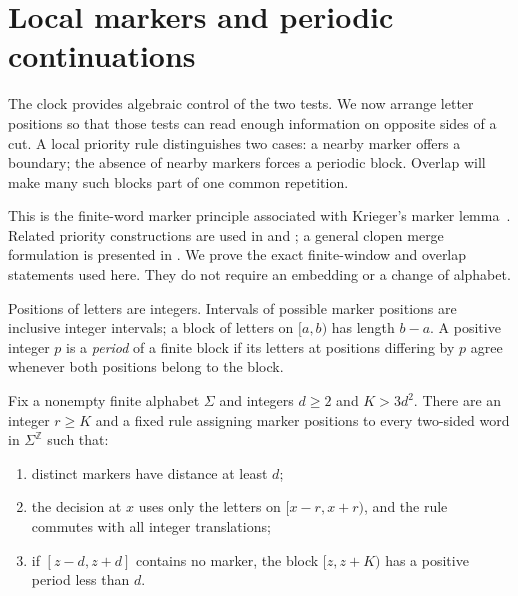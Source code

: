 \section{Local markers and periodic continuations}\label{marker:section}

The clock provides algebraic control of the two tests. We now arrange
letter positions so that those tests can read enough information on
opposite sides of a cut. A local priority rule distinguishes two cases:
a nearby marker offers a boundary; the absence of nearby markers forces
a periodic block. Overlap will make many such blocks part of one common
repetition.

This is the finite-word marker principle associated with Krieger's
marker lemma~\cite[Lemma~2]{Krieger1982}. Related priority constructions
are used in \cite[Section~4]{HeightThirteen} and
\cite[Section~4.1]{HeightFour}; a general clopen merge formulation is
presented in \cite[Lemmas~3.2--3.4]{Meyerovitch2025}. We prove the exact
finite-window and overlap statements used here. They do not require an
embedding or a change of alphabet.

Positions of letters are integers. Intervals of possible marker
positions are inclusive integer intervals; a block of letters on
$[a,b)$ has length $b-a$. A positive integer $p$ is a \emph{period}
of a finite block if its letters at positions differing by $p$ agree
whenever both positions belong to the block.

\begin{lemma}\label{marker:local}
Fix a nonempty finite alphabet $\Sigma$ and integers $d\ge2$ and
$K>3d^2$. There are an integer $r\ge K$ and a fixed rule assigning
marker positions to every two-sided word in $\Sigma^{\mathbb Z}$
such that:
\begin{enumerate}[label=\textup{(\roman*)}]
\item distinct markers have distance at least $d$;
\item the decision at $x$ uses only the letters on $[x-r,x+r)$, and
the rule commutes with all integer translations;
\item if $[z-d,z+d]$ contains no marker, the block $[z,z+K)$ has a
positive period less than $d$.
\end{enumerate}
\end{lemma}


